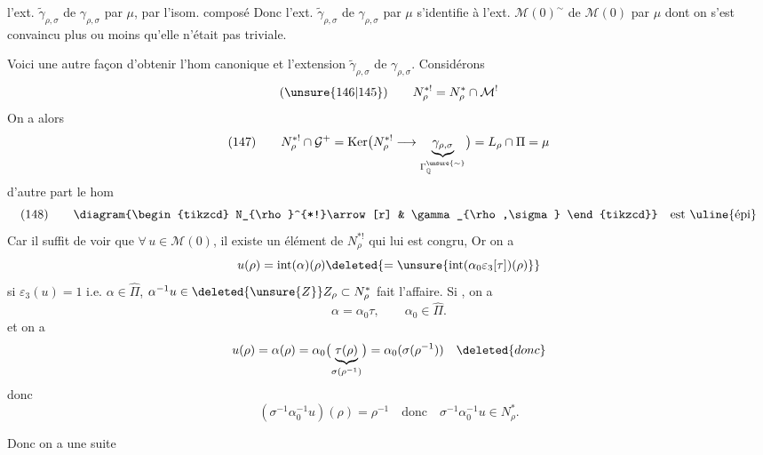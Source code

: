 
l'ext. $\widetilde\gamma_{\rho,\sigma}$ de $\gamma_{\rho,\sigma}$ par $\mu$,
par l'isom. composé
Donc l'ext. $\widetilde\gamma_{\rho,\sigma}$ de $\gamma_{\rho,\sigma}$ par
$\mu$ s'identifie  à l'ext. $\mathcal M(0)^{\sim}$ de
$\mathcal M(0)$ par $\mu$ dont on s'est convaincu plus ou moins qu'elle
n'était pas triviale.

Voici une autre façon d'obtenir l'hom canonique
et l'extension $\widetilde\gamma_{\rho,\sigma}$ de $\gamma_{\rho,\sigma}$.
Considérons
\[
 (\unsure{146|145})\qquad N_{\rho}^{*!}=N^*_{\rho}\cap\mathcal M^!
\]
On a alors
\[
 (147)\qquad
 N_{\rho}^{*!}\cap\mathcal G^+
 =\operatorname{Ker}\bigl(N_{\rho}^{*!}\longrightarrow
     \underbrace{\gamma_{\rho,\sigma}}_{\Gamma_{\mathbb Q}^{\unsure{\sim}}}\bigr)
 =L_{\rho}\cap\Pi=\mu
\]
d'autre part le hom
\[
 (148)\qquad
 \diagram{\begin{tikzcd}
 N_{\rho}^{*!}\arrow[r] & \gamma_{\rho,\sigma}
 \end{tikzcd}}
 \quad\text{est \uline{épi}}
\]
Car  il suffit de voir que 
$\forall\,u\in\mathcal M(0)$, il existe un élément de $N_{\rho}^{*!}$
qui lui est congru,  Or on a
\[
 u(\rho)=\operatorname{int}(\alpha)(\rho)
 \deleted{=\unsure{\operatorname{int}(\alpha_0\varepsilon_3[\tau])(\rho)}}
\]
si $\varepsilon_3(u)=1$ i.e. $\alpha\in\widehat\Pi$,
$\alpha^{-1}u\in\deleted{\unsure{Z}}Z_{\rho}\subset N^*_{\rho}$
fait l'affaire. Si 
, on a
\[
 \alpha=\alpha_0\tau,\qquad\alpha_0\in\widehat\Pi.
\]
et on a
\[
 u(\rho)=\alpha(\rho)=
 \alpha_0\bigl(\underbrace{\tau(\rho)}_{\sigma(\rho^{-1})}\bigr)
 =\alpha_0(\sigma(\rho^{-1}))\quad\deleted{donc}
\]
donc
\[
 (\sigma^{-1}\alpha_0^{-1}u)(\rho)=\rho^{-1}
 \quad\text{donc}\quad\sigma^{-1}\alpha_0^{-1}u\in N^*_{\rho}.
\]


Donc on a une suite 

